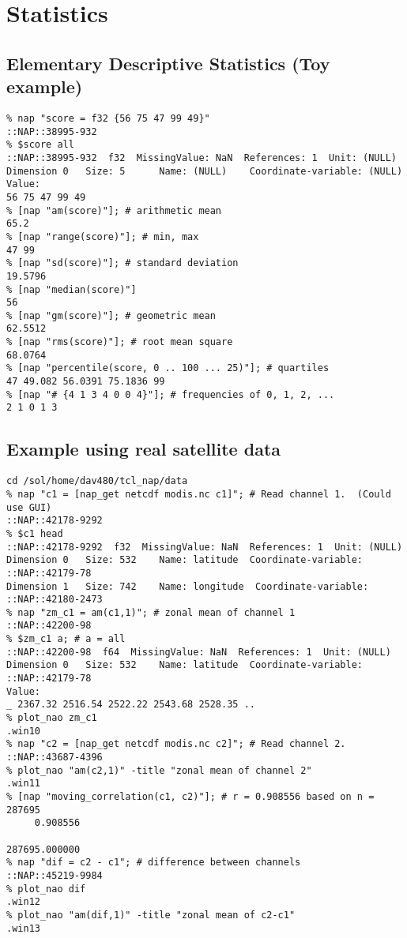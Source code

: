 
\section{Statistics}

\subsection{Elementary Descriptive Statistics (Toy example)}

    \begin{verbatim}
% nap "score = f32 {56 75 47 99 49}"
::NAP::38995-932
% $score all
::NAP::38995-932  f32  MissingValue: NaN  References: 1  Unit: (NULL)
Dimension 0   Size: 5      Name: (NULL)    Coordinate-variable: (NULL)
Value:
56 75 47 99 49
% [nap "am(score)"]; # arithmetic mean
65.2
% [nap "range(score)"]; # min, max
47 99
% [nap "sd(score)"]; # standard deviation
19.5796
% [nap "median(score)"]
56
% [nap "gm(score)"]; # geometric mean
62.5512
% [nap "rms(score)"]; # root mean square
68.0764
% [nap "percentile(score, 0 .. 100 ... 25)"]; # quartiles
47 49.082 56.0391 75.1836 99
% [nap "# {4 1 3 4 0 0 4}"]; # frequencies of 0, 1, 2, ...
2 1 0 1 3
\end{verbatim}

\subsection{Example using real satellite data}

    \begin{verbatim}
cd /sol/home/dav480/tcl_nap/data
% nap "c1 = [nap_get netcdf modis.nc c1]"; # Read channel 1.  (Could use GUI)
::NAP::42178-9292
% $c1 head
::NAP::42178-9292  f32  MissingValue: NaN  References: 1  Unit: (NULL)
Dimension 0   Size: 532    Name: latitude  Coordinate-variable: ::NAP::42179-78
Dimension 1   Size: 742    Name: longitude  Coordinate-variable: ::NAP::42180-2473
% nap "zm_c1 = am(c1,1)"; # zonal mean of channel 1
::NAP::42200-98
% $zm_c1 a; # a = all
::NAP::42200-98  f64  MissingValue: NaN  References: 1  Unit: (NULL)
Dimension 0   Size: 532    Name: latitude  Coordinate-variable: ::NAP::42179-78
Value:
_ 2367.32 2516.54 2522.22 2543.68 2528.35 ..
% plot_nao zm_c1
.win10
% nap "c2 = [nap_get netcdf modis.nc c2]"; # Read channel 2.
::NAP::43687-4396
% plot_nao "am(c2,1)" -title "zonal mean of channel 2"
.win11
% [nap "moving_correlation(c1, c2)"]; # r = 0.908556 based on n = 287695
     0.908556

287695.000000
% nap "dif = c2 - c1"; # difference between channels
::NAP::45219-9984
% plot_nao dif
.win12
% plot_nao "am(dif,1)" -title "zonal mean of c2-c1"
.win13
\end{verbatim}

